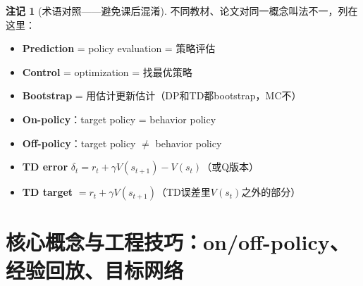 \documentclass[11pt,a4paper]{article}
\theoremstyle{definition}
\newtheorem{remark}{注记}[section]
\begin{document}
\begin{remark}[术语对照——避免课后混淆]
不同教材、论文对同一概念叫法不一，列在这里：
\begin{itemize}
\item \textbf{Prediction} = policy evaluation = 策略评估
\item \textbf{Control} = optimization = 找最优策略
\item \textbf{Bootstrap} = 用估计更新估计（DP和TD都bootstrap，MC不）
\item \textbf{On-policy}：target policy = behavior policy
\item \textbf{Off-policy}：target policy $\neq$ behavior policy
\item \textbf{TD error} $\delta_t = r_t + \gamma V(s_{t+1}) - V(s_t)$（或Q版本）
\item \textbf{TD target} $= r_t + \gamma V(s_{t+1})$（TD误差里$V(s_t)$之外的部分）
\end{itemize}
\end{remark}


\section{核心概念与工程技巧：on/off-policy、经验回放、目标网络}
\end{document}
